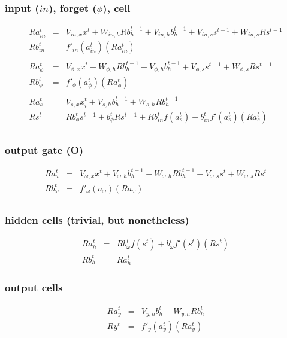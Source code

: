 \documentclass{article}
\begin{document}
\subsubsection{input ($in$), forget ($\phi$), cell}
\begin{eqnarray*}
Ra_{in}^t &=& V_{in,x}x^t + W_{in,h}Rb_h^{t-1}+ V_{in,h}b_h^{t-1} + V_{in,s}s^{t-1} + W_{in,s}Rs^{t-1} \\
Rb_{in}^t &=& f'_{in}(a_{in}^t)(Ra_{in}^t) \\
\\
Ra_{\phi}^t &=& V_{\phi, x}x^t + W_{\phi, h}Rb_h^{t-1} + V_{\phi, h}b_h^{t-1} + V_{\phi, s}s^{t-1} + W_{\phi, s}Rs^{t-1}\\
Rb_{\phi}^t &=& f'_{\phi}(a_{\phi}^t)(Ra_{\phi}^t) \\
\\
Ra_s^t &=& V_{s,x}x_i^t + V_{s,h}b_h^{t-1} + W_{s,h}Rb_h^{t-1} \\
Rs^t &=& Rb_{\phi}^ts^{t-1} + b_{\phi}^tRs^{t-1} + Rb_{in}^tf(a_s^t) + b_{in}^tf'(a_s^t)(Ra_s^t) \\  
\end{eqnarray*}

\subsubsection{output gate (O)}
\begin{eqnarray*}
Ra_{\omega}^t &=& V_{\omega,x}x^t + V_{\omega,h}b_h^{t-1} + W_{\omega,h}Rb_h^{t-1} + V_{\omega,s}s^t + W_{\omega,s}Rs^t \\
Rb_{\omega}^t &=& f'_{\omega}(a_{\omega})(Ra_{\omega}) \\
\end{eqnarray*}

\subsubsection{hidden cells (trivial, but nonetheless)}
\begin{eqnarray*}
Ra_h^t &=& Rb_{\omega}^t f(s^t)+b_{\omega}^t f'(s^t)(Rs^t) \\
Rb_h^t &=& Ra_h^t 
\end{eqnarray*}

\subsubsection{output cells}
\begin{eqnarray*}
Ra_y^t &=& V_{y,h}b_h^t + W_{y,h}Rb_h^t \\
Ry^t &=& f'_y(a_y^t)(Ra_y^t) 
\end{eqnarray*}
\end{document}
